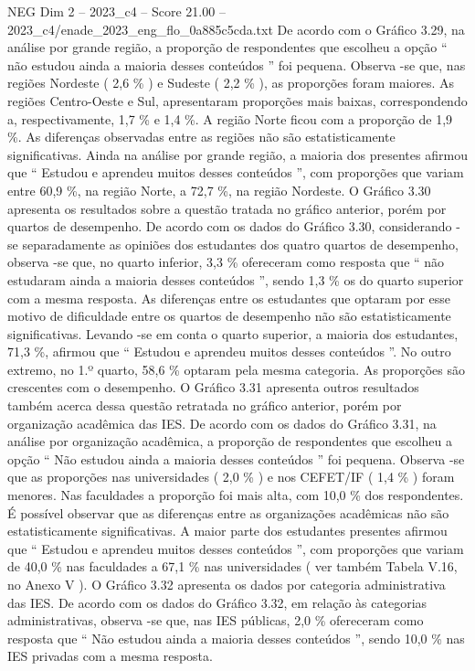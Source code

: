 \begin{textsample}{NEG Dim 2 – 2023\_c4 – Score 21.00 – 2023\_c4/enade\_2023\_eng\_flo\_0a885c5cda.txt}
De acordo com o Gráfico 3.29, na análise por grande região, a proporção de respondentes que escolheu a opção “ não estudou ainda a maioria desses conteúdos ” foi pequena.
Observa -se que, nas regiões Nordeste ( 2,6 \% ) e Sudeste ( 2,2 \% ), as proporções foram maiores.
As regiões Centro-Oeste e Sul, apresentaram proporções mais baixas, correspondendo a, respectivamente, 1,7 \% e 1,4 \%.
A região Norte ficou com a proporção de 1,9 \%.
As diferenças observadas entre as regiões não são estatisticamente significativas.
Ainda na análise por grande região, a maioria dos presentes afirmou que “ Estudou e aprendeu muitos desses conteúdos ”, com proporções que variam entre 60,9 \%, na região Norte, a 72,7 \%, na região Nordeste.
O Gráfico 3.30 apresenta os resultados sobre a questão tratada no gráfico anterior, porém por quartos de desempenho.
De acordo com os dados do Gráfico 3.30, considerando -se separadamente as opiniões dos estudantes dos quatro quartos de desempenho, observa -se que, no quarto inferior, 3,3 \% ofereceram como resposta que “ não estudaram ainda a maioria desses conteúdos ”, sendo 1,3 \% os do quarto superior com a mesma resposta.
As diferenças entre os estudantes que optaram por esse motivo de dificuldade entre os quartos de desempenho não são estatisticamente significativas.
Levando -se em conta o quarto superior, a maioria dos estudantes, 71,3 \%, afirmou que “ Estudou e aprendeu muitos desses conteúdos ”.
No outro extremo, no 1.º quarto, 58,6 \% optaram pela mesma categoria.
As proporções são crescentes com o desempenho.
O Gráfico 3.31 apresenta outros resultados também acerca dessa questão retratada no gráfico anterior, porém por organização acadêmica das IES.
De acordo com os dados do Gráfico 3.31, na análise por organização acadêmica, a proporção de respondentes que escolheu a opção “ Não estudou ainda a maioria desses conteúdos ” foi pequena.
Observa -se que as proporções nas universidades ( 2,0 \% ) e nos CEFET/IF ( 1,4 \% ) foram menores.
Nas faculdades a proporção foi mais alta, com 10,0 \% dos respondentes.
É possível observar que as diferenças entre as organizações acadêmicas não são estatisticamente significativas.
A maior parte dos estudantes presentes afirmou que “ Estudou e aprendeu muitos desses conteúdos ”, com proporções que variam de 40,0 \% nas faculdades a 67,1 \% nas universidades ( ver também Tabela V.16, no Anexo V ).
O Gráfico 3.32 apresenta os dados por categoria administrativa das IES.
De acordo com os dados do Gráfico 3.32, em relação às categorias administrativas, observa -se que, nas IES públicas, 2,0 \% ofereceram como resposta que “ Não estudou ainda a maioria desses conteúdos ”, sendo 10,0 \% nas IES privadas com a mesma resposta.

\end{textsample}
